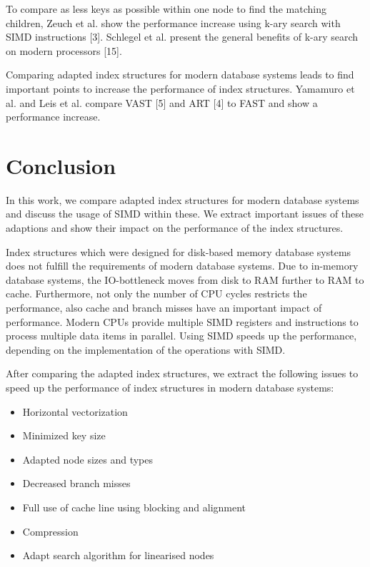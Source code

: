 \documentclass[conference]{IEEEtran}
\begin{document}
To compare as less keys as possible within one node to find the matching children, Zeuch et al. show the performance increase using k-ary search with SIMD instructions [3]. Schlegel et al. present the general benefits of k-ary search on modern processors [15]. 

Comparing adapted index structures for modern database systems leads to find important points to increase the performance of index structures. Yamamuro et al. and Leis et al. compare VAST [5] and ART [4] to FAST and show a performance increase. 

\section{Conclusion}
In this work, we compare adapted index structures for modern database systems and discuss the usage of SIMD within these. We extract important issues of these adaptions and show their impact on the performance of the index structures. 

Index structures which were designed for disk-based memory database systems does not fulfill the requirements of modern database systems. Due to in-memory database systems, the IO-bottleneck moves from disk to RAM further to RAM to cache. Furthermore, not only the number of CPU cycles restricts the performance, also cache and branch misses have an important impact of performance. Modern CPUs provide multiple SIMD registers and instructions to process multiple data items in parallel. Using SIMD speeds up the performance, depending on the implementation of the operations with SIMD.

After comparing the adapted index structures, we extract the following issues to speed up the performance of index structures in modern database systems:
\begin{itemize}
	\item Horizontal vectorization
	\item Minimized key size
	\item Adapted node sizes and types
	\item Decreased branch misses
	\item Full use of cache line using blocking and alignment
	\item Compression
	\item Adapt search algorithm for linearised nodes
\end{itemize}
\end{document}
